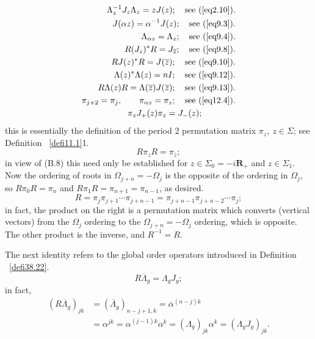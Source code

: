 \documentclass{surv-l}
\theoremstyle{plain}
\theoremstyle{definition}
\numberwithin{equation}{chapter}
\begin{document}
{\begin{align}\label{B.1}
\Lambda_{z}^{-1}J_{z}\Lambda_{z}=zJ(z);\quad \text{see (\ref{eq2.10})}.\\\label{B.2}
J(\alpha z)=\alpha^{-1}J(z);\quad \text{see (\ref{eq9.3})}.\\\label{B.3}
\Lambda_{\alpha z}=\Lambda_{z};\quad \text{see (\ref{eq9.4})}.\\\label{B.4}
R(J_{z})^{*}R=J_{\overline{z}};\quad \text{see (\ref{eq9.8})}.\\\label{B.5}
RJ(z)^{*}R=J(\overline{z});\quad \text{see (\ref{eq9.10})}.\\\label{B.6}
\Lambda(z)^{*}\Lambda(z)=nI;\quad \text{see (\ref{eq9.12})}.\\\label{B.7}
R\Lambda(z)R=\Lambda(\overline{z})J(\overline{z});\quad \text{see (\ref{eq9.13})}.\\\label{B.8}
\pi_{j+2}=\pi_{j},\qquad \pi_{\alpha z}=\pi_{z};\quad \text{see (\ref{eq12.4})}.\\\label{B.9}
\pi_{z}J_{+}(z)\pi_{z}=J_{-}(z);\qquad \qquad
\end{align}
this is essentially the definition of the period 2 permutation matrix $\pi_{z},\ z\in\Sigma$; see Definition ~\ref{defi11.1}1.
\begin{equation}\label{eqB.10}
R\pi_{z}R=\pi_{\overline{z}};
\end{equation}
in view of (B.8) this need only be established for $z\in\Sigma_{0}=-i\textbf{R}_{+}$ and $z\in\Sigma_{1}$. Now the ordering of roots in $\Omega_{j+n}=-\Omega_{j}$ is the opposite of the ordering in $\Omega_{j}$, so $R\pi_{0}R=\pi_{n}$ and $R\pi_{1}R=\pi_{n+1}=\pi_{n-1}$, as desired.
\begin{equation}\label{eqB.11}
R=\pi_{j}\pi_{j+1}\cdots \pi_{j+n-1}=\pi_{j+n-1}\pi_{j+n-2}\cdots \pi_{j};
\end{equation}
in fact, the product on the right is a permutation matrix which converts (vertical vectors) from the $\Omega_{j}$ ordering to the $\Omega_{j+n}=-\Omega_{j}$ ordering, which is opposite. The other product is the inverse, and $R^{-1}=R$.

The next identity refers to the global order operators introduced in Definition ~\ref{defi38.22}.
\begin{equation}\label{eqB.12}
R\overline{\Lambda}_{g}=\Lambda_{g}J_{g};
\end{equation}
in fact,
\begin{align*}
(R\overline{\Lambda}_{g})_{jk} & =(\overline{\Lambda}_{g})_{n-j+1,k}=\overline{\alpha}^{(n-j)k}\\
& =\alpha^{j k}=\alpha^{(j-1)k}\alpha^{k}=(\Lambda_{g})_{j k}\alpha^{k}=(\Lambda_{g}J_{g})_{j k}.
\end{align*}

}
\end{document}
